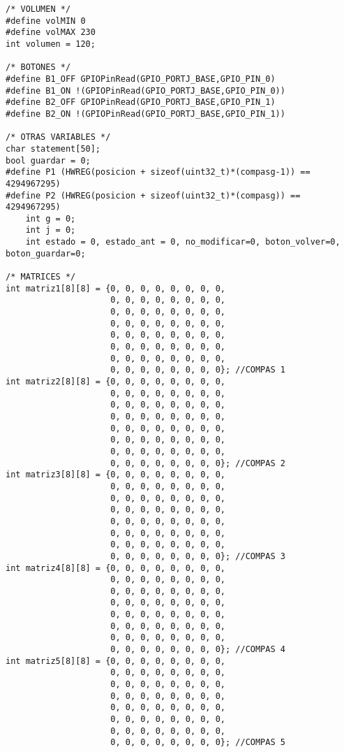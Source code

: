 \documentclass[12pt,a4paper]{article}
\begin{document}
\begin{lstlisting}[basicstyle=\footnotesize]
/* VOLUMEN */
#define volMIN 0
#define volMAX 230
int volumen = 120;

/* BOTONES */
#define B1_OFF GPIOPinRead(GPIO_PORTJ_BASE,GPIO_PIN_0)
#define B1_ON !(GPIOPinRead(GPIO_PORTJ_BASE,GPIO_PIN_0))
#define B2_OFF GPIOPinRead(GPIO_PORTJ_BASE,GPIO_PIN_1)
#define B2_ON !(GPIOPinRead(GPIO_PORTJ_BASE,GPIO_PIN_1))

/* OTRAS VARIABLES */
char statement[50];
bool guardar = 0;
#define P1 (HWREG(posicion + sizeof(uint32_t)*(compasg-1)) == 4294967295)
#define P2 (HWREG(posicion + sizeof(uint32_t)*(compasg)) == 4294967295)
    int g = 0;
    int j = 0;
    int estado = 0, estado_ant = 0, no_modificar=0, boton_volver=0, boton_guardar=0;

/* MATRICES */
int matriz1[8][8] = {0, 0, 0, 0, 0, 0, 0, 0,
                     0, 0, 0, 0, 0, 0, 0, 0,
                     0, 0, 0, 0, 0, 0, 0, 0,
                     0, 0, 0, 0, 0, 0, 0, 0,
                     0, 0, 0, 0, 0, 0, 0, 0,
                     0, 0, 0, 0, 0, 0, 0, 0,
                     0, 0, 0, 0, 0, 0, 0, 0,
                     0, 0, 0, 0, 0, 0, 0, 0}; //COMPAS 1
int matriz2[8][8] = {0, 0, 0, 0, 0, 0, 0, 0,
                     0, 0, 0, 0, 0, 0, 0, 0,
                     0, 0, 0, 0, 0, 0, 0, 0,
                     0, 0, 0, 0, 0, 0, 0, 0,
                     0, 0, 0, 0, 0, 0, 0, 0,
                     0, 0, 0, 0, 0, 0, 0, 0,
                     0, 0, 0, 0, 0, 0, 0, 0,
                     0, 0, 0, 0, 0, 0, 0, 0}; //COMPAS 2
int matriz3[8][8] = {0, 0, 0, 0, 0, 0, 0, 0,
                     0, 0, 0, 0, 0, 0, 0, 0,
                     0, 0, 0, 0, 0, 0, 0, 0,
                     0, 0, 0, 0, 0, 0, 0, 0,
                     0, 0, 0, 0, 0, 0, 0, 0,
                     0, 0, 0, 0, 0, 0, 0, 0,
                     0, 0, 0, 0, 0, 0, 0, 0,
                     0, 0, 0, 0, 0, 0, 0, 0}; //COMPAS 3
int matriz4[8][8] = {0, 0, 0, 0, 0, 0, 0, 0,
                     0, 0, 0, 0, 0, 0, 0, 0,
                     0, 0, 0, 0, 0, 0, 0, 0,
                     0, 0, 0, 0, 0, 0, 0, 0,
                     0, 0, 0, 0, 0, 0, 0, 0,
                     0, 0, 0, 0, 0, 0, 0, 0,
                     0, 0, 0, 0, 0, 0, 0, 0,
                     0, 0, 0, 0, 0, 0, 0, 0}; //COMPAS 4
int matriz5[8][8] = {0, 0, 0, 0, 0, 0, 0, 0,
                     0, 0, 0, 0, 0, 0, 0, 0,
                     0, 0, 0, 0, 0, 0, 0, 0,
                     0, 0, 0, 0, 0, 0, 0, 0,
                     0, 0, 0, 0, 0, 0, 0, 0,
                     0, 0, 0, 0, 0, 0, 0, 0,
                     0, 0, 0, 0, 0, 0, 0, 0,
                     0, 0, 0, 0, 0, 0, 0, 0}; //COMPAS 5

\end{lstlisting}
\end{document}
